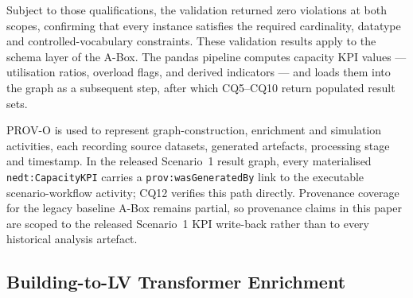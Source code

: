 \documentclass[preprint,12pt]{elsarticle}
\begin{document}
Subject to those qualifications, the validation returned zero violations at
both scopes, confirming that every instance satisfies the required
cardinality, datatype and controlled-vocabulary constraints.
These validation results apply to the schema layer of the A-Box.
The pandas pipeline computes capacity KPI values --- utilisation ratios,
overload flags, and derived indicators --- and loads them into the graph as a
subsequent step, after which CQ5--CQ10 return populated result sets.

PROV-O is used to represent graph-construction, enrichment and simulation
activities, each recording source datasets, generated artefacts, processing
stage and timestamp. In the released Scenario~1 result graph, every
materialised 
\texttt{nedt:CapacityKPI} carries a
\texttt{prov:wasGeneratedBy} link to the executable scenario-workflow
activity; CQ12 verifies this path directly. Provenance coverage for the
legacy baseline A-Box remains partial, so provenance claims in this paper are
scoped to the released Scenario~1 KPI write-back rather than to every
historical analysis artefact.

\subsection{Building-to-LV Transformer Enrichment}
\label{sec:lv-enrichment}
\end{document}
